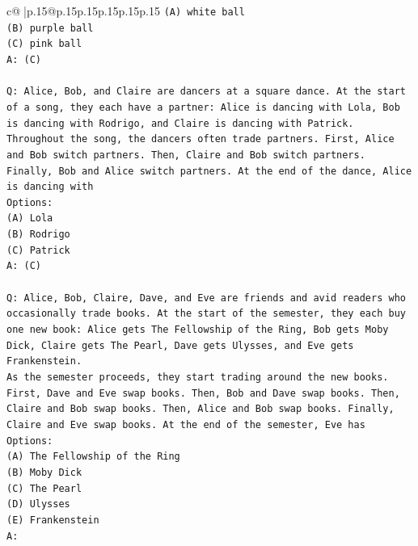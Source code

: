 \documentclass{article}
\begin{document}
{\begin{supertabular}{c@{$\;$}|p{.15\linewidth}@{}p{.15\linewidth}p{.15\linewidth}p{.15\linewidth}p{.15\linewidth}p{.15\linewidth}}
{{{\texttt{(A) white ball} \\
\texttt{(B) purple ball} \\
\texttt{(C) pink ball} \\
\texttt{A: (C)} \\
\\ 
\texttt{Q: Alice, Bob, and Claire are dancers at a square dance. At the start of a song, they each have a partner: Alice is dancing with Lola, Bob is dancing with Rodrigo, and Claire is dancing with Patrick.} \\
\texttt{Throughout the song, the dancers often trade partners. First, Alice and Bob switch partners. Then, Claire and Bob switch partners. Finally, Bob and Alice switch partners. At the end of the dance, Alice is dancing with} \\
\texttt{Options:} \\
\texttt{(A) Lola} \\
\texttt{(B) Rodrigo} \\
\texttt{(C) Patrick} \\
\texttt{A: (C)} \\
\\ 
\texttt{Q: Alice, Bob, Claire, Dave, and Eve are friends and avid readers who occasionally trade books. At the start of the semester, they each buy one new book: Alice gets The Fellowship of the Ring, Bob gets Moby Dick, Claire gets The Pearl, Dave gets Ulysses, and Eve gets Frankenstein.} \\
\texttt{As the semester proceeds, they start trading around the new books. First, Dave and Eve swap books. Then, Bob and Dave swap books. Then, Claire and Bob swap books. Then, Alice and Bob swap books. Finally, Claire and Eve swap books. At the end of the semester, Eve has} \\
\texttt{Options:} \\
\texttt{(A) The Fellowship of the Ring} \\
\texttt{(B) Moby Dick} \\
\texttt{(C) The Pearl} \\
\texttt{(D) Ulysses} \\
\texttt{(E) Frankenstein} \\
\texttt{A:} \\
            }
        }
    }
     \\ \\


\end{supertabular}}
\end{document}
